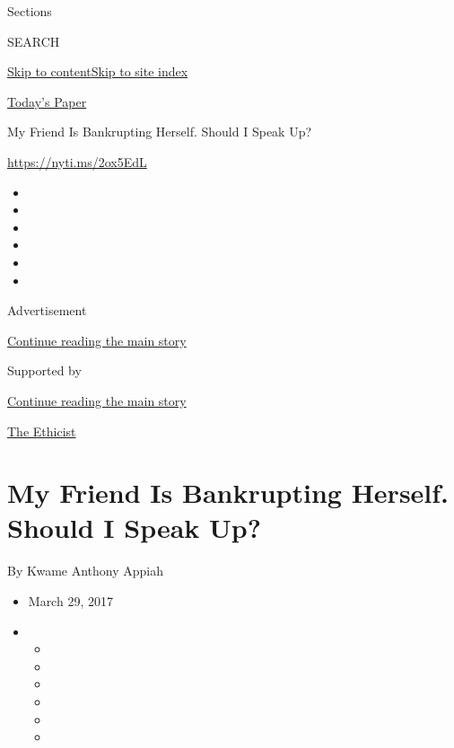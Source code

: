 Sections

SEARCH

\protect\hyperlink{site-content}{Skip to
content}\protect\hyperlink{site-index}{Skip to site index}

\href{https://myaccount.nytimes3xbfgragh.onion/auth/login?response_type=cookie\&client_id=vi}{}

\href{https://www.nytimes3xbfgragh.onion/section/todayspaper}{Today's
Paper}

My Friend Is Bankrupting Herself. Should I Speak Up?

\url{https://nyti.ms/2ox5EdL}

\begin{itemize}
\item
\item
\item
\item
\item
\item
\end{itemize}

Advertisement

\protect\hyperlink{after-top}{Continue reading the main story}

Supported by

\protect\hyperlink{after-sponsor}{Continue reading the main story}

\href{/column/the-ethicist}{The Ethicist}

\hypertarget{my-friend-is-bankrupting-herself-should-i-speak-up}{%
\section{My Friend Is Bankrupting Herself. Should I Speak
Up?}\label{my-friend-is-bankrupting-herself-should-i-speak-up}}

By Kwame Anthony Appiah

\begin{itemize}
\item
  March 29, 2017
\item
  \begin{itemize}
  \item
  \item
  \item
  \item
  \item
  \item
  \end{itemize}
\end{itemize}

